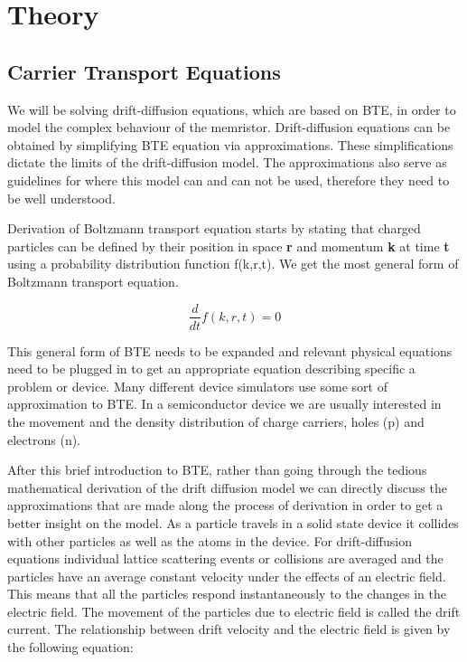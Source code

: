 
\chapter{Theory} %

\label{Chapter2} %


\section{Carrier Transport Equations}
We will be solving drift-diffusion equations, which are based on BTE, in order to model the complex behaviour of the memristor. Drift-diffusion equations can be obtained by simplifying BTE equation via approximations. These simplifications dictate the limits of the drift-diffusion model. The approximations also serve as guidelines for where this model can and can not be used, therefore they need to be well understood.

Derivation of Boltzmann transport equation starts by stating that charged particles can be defined by their position in space \textbf{r} and momentum \textbf{k} at time \textbf{t} using a probability distribution function f(k,r,t). We get the most general form of Boltzmann transport equation. \cite{snowden} 

\begin{equation}
\frac{d }{dt}f(k,r,t)=0
\end{equation}

This general form of BTE needs to be expanded and relevant physical equations need to be plugged in to get an appropriate equation describing specific a problem or device. 
Many different device simulators use some sort of approximation to BTE. In a semiconductor device we are usually interested in the movement and the density distribution of charge carriers, holes (p) and electrons (n). 

After this brief introduction to BTE, rather than going through the tedious mathematical derivation of the drift diffusion model we can directly discuss the approximations that are made along the process of derivation in order to get a better insight on the model.  As a particle travels in a solid state device it collides with other particles as well as the atoms in the device. For drift-diffusion equations individual lattice scattering events or collisions are averaged and the particles have an average constant velocity under the effects of an electric field. This means that all the particles respond instantaneously to the changes in the electric field. The movement of the particles due to electric field is called the drift current. The relationship between drift velocity and the electric field is given by the following equation:


